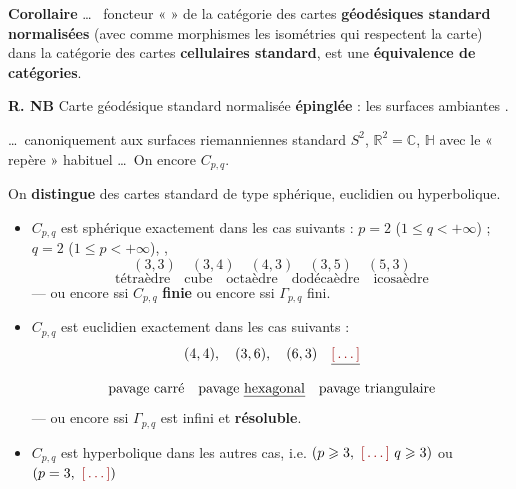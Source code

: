 \documentclass[11pt,a4paper]{article}
\begin{document}
\textbf{Corollaire} \ldots\ \ill{} foncteur «  » de la
catégorie des cartes \textbf{géodésiques standard normalisées} (avec comme
morphismes les isométries qui respectent la carte) dans la catégorie des cartes
\textbf{cellulaires standard}, est une \textbf{équivalence de catégories}.

\textbf{R. NB} Carte géodésique standard normalisée \textbf{épinglée} : les
surfaces ambiantes .


\ldots\ canoniquement aux surfaces riemanniennes standard 
$S^2$, $\mathbb{R}^2 = \mathbb{C}$, $\mathbb{H}$ avec le « repère »
 habituel \ldots\ On  encore  $C_{p,q}$.

\struck{\ill{}} On \textbf{distingue}  des cartes standard de
type sphérique, euclidien ou hyperbolique.

\begin{itemize}
  \item[(6)] \struck{\ill{}} $C_{p,q}$ est sphérique
    \struck{\ill{}} exactement dans les cas suivants :
     $p = 2$ ($1 \leqslant q < +\infty$) ; $q = 2$
    ($1 \leqslant p < +\infty$), ,
    \[
      (3,3) \quad (3,4) \quad (4,3) \quad (3,5) \quad (5,3)
    \]
    \[
      \text{tétraèdre} \quad \text{cube} \quad \text{octaèdre} \quad
      \text{dodécaèdre} \quad \text{icosaèdre}
    \]
    — ou encore ssi $C_{p,q}$ \textbf{finie} ou encore ssi $\Gamma_{p,q}$ fini.

  \item[(b)] $C_{p,q}$ est euclidien exactement dans les cas suivants :
    \[
      (4,4), \quad (3,6), \quad (6,3) \quad \struck{\ill{}}
    \]
    \[
      \text{pavage carré} \quad \text{pavage \uncertain{hexagonal}} \quad
      \text{pavage triangulaire}
    \]
    — ou encore ssi $\Gamma_{p,q}$ est infini et \textbf{résoluble}.

  \item[(c)] $C_{p,q}$ est hyperbolique dans les autres cas, i.e.
     $(p \geqslant 3,\ \ill{}\ q \geqslant 3)$ ou
    $(p = 3,\ \ill{})$
\end{itemize}
\end{document}
